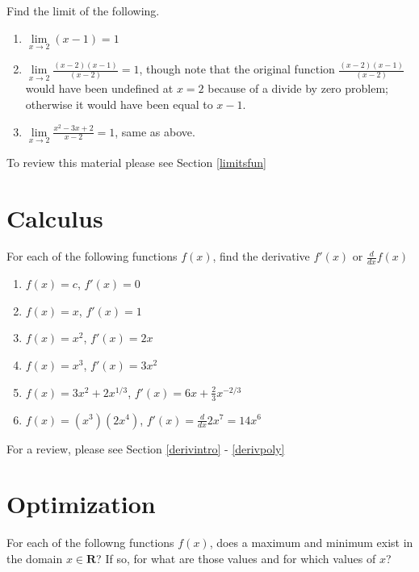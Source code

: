 \documentclass[
]{book}
\providecommand{\tightlist}{%
  \setlength{\itemsep}{0pt}\setlength{\parskip}{0pt}}
\theoremstyle{definition}
\theoremstyle{definition}
\theoremstyle{definition}
\theoremstyle{definition}
\theoremstyle{remark}
\begin{document}
Find the limit of the following.

\begin{enumerate}
\def\labelenumi{\arabic{enumi}.}
\tightlist
\item
  \(\lim\limits_{x \to 2} (x - 1) = 1\)
\item
  \(\lim\limits_{x \to 2} \frac{(x - 2) (x - 1)}{(x - 2)} = 1\), though note that the original function \(\frac{(x - 2) (x - 1)}{(x - 2)}\) would have been undefined at \(x = 2\) because of a divide by zero problem; otherwise it would have been equal to \(x - 1\).
\item
  \(\lim\limits_{x \to 2}\frac{x^2 - 3x + 2}{x- 2} = 1\), same as above.
\end{enumerate}

To review this material please see Section \ref{limitsfun}

\hypertarget{calculus-1}{%
\section*{Calculus}\label{calculus-1}}

For each of the following functions \(f(x)\), find the derivative \(f'(x)\) or \(\frac{d}{dx}f(x)\)

\begin{enumerate}
\def\labelenumi{\arabic{enumi}.}
\tightlist
\item
  \(f(x)=c\), \(f'(x) = 0\)
\item
  \(f(x)=x\), \(f'(x) = 1\)
\item
  \(f(x)=x^2\), \(f'(x) = 2x\)
\item
  \(f(x)=x^3\), \(f'(x) = 3x^2\)
\item
  \(f(x)=3x^2+2x^{1/3}\), \(f'(x) = 6x + \frac{2}{3}x^{-2/3}\)
\item
  \(f(x)=(x^3)(2x^4)\), \(f'(x) = \frac{d}{dx}2x^7 = 14x^6\)
\end{enumerate}

For a review, please see Section \ref{derivintro} - \ref{derivpoly}

\hypertarget{optimization-1}{%
\section*{Optimization}\label{optimization-1}}

For each of the followng functions \(f(x)\), does a maximum and minimum exist in the domain \(x \in \mathbf{R}\)? If so, for what are those values and for which values of \(x\)?
\end{document}

